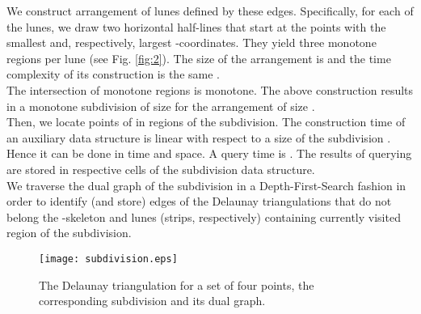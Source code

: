 \documentclass[10pt]{article}
\begin{document}
We construct arrangement of lunes defined by these edges. 
Specifically, for each of the lunes, we draw two horizontal half-lines 
that start at the points with the smallest and, respectively, largest 
-coordinates. They yield three monotone regions per lune (see Fig. \ref{fig:2}).    
The size of the arrangement is  
and the time complexity of its construction is the same \cite{agr00}. \\
The intersection of monotone regions is monotone. The above construction 
results in a monotone subdivision of size  for the arrangement of size . \\
Then, we locate points of  in regions of the subdivision. The construction time of an auxiliary data structure 
is linear with respect to a size of the subdivision \cite{egs86}.  Hence it can be done in  time and  
space. A query time is . The results of querying are stored in respective cells of the subdivision 
data structure. \\
We traverse the dual graph of the subdivision in a Depth-First-Search fashion
in order to identify (and store) edges of the Delaunay triangulations that do not belong the -skeleton 
and lunes (strips, respectively)
containing currently visited region of the subdivision. \\


\begin{figure}[hbt]
\begin{center}
\texttt{[image: subdivision.eps]}
\caption{ The Delaunay triangulation for a set of four points, the corresponding 
subdivision and its dual graph. }
\label{fig:3}
\end{center}
\end{figure}
\end{document}
